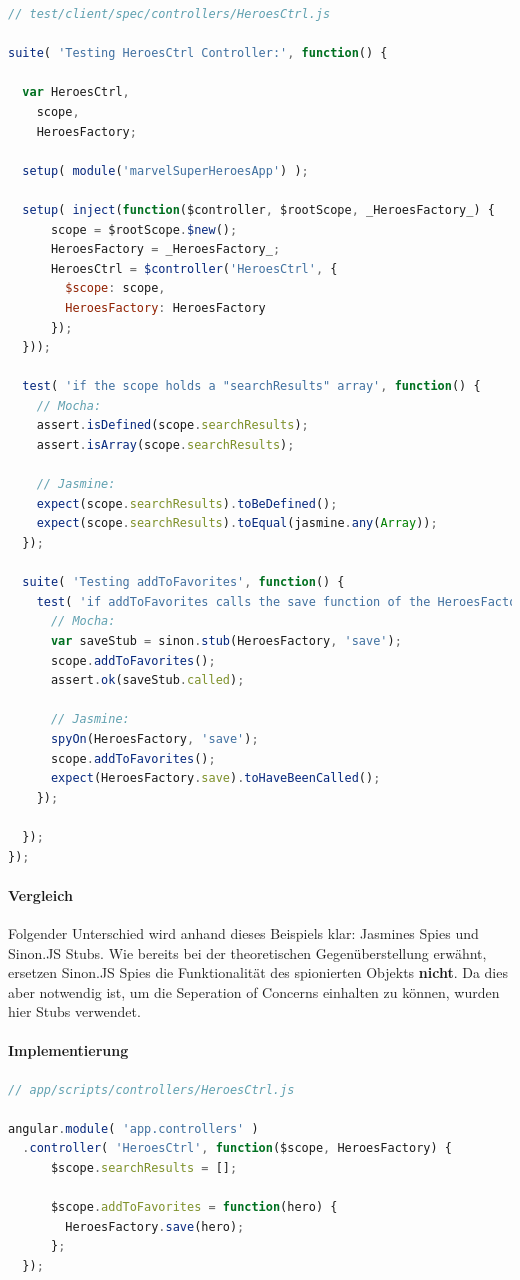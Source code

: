 \begin{lstlisting}[language=JavaScript, caption=TDD AngularJS - Controller]
// test/client/spec/controllers/HeroesCtrl.js

suite( 'Testing HeroesCtrl Controller:', function() {

  var HeroesCtrl,
    scope,
    HeroesFactory;

  setup( module('marvelSuperHeroesApp') );

  setup( inject(function($controller, $rootScope, _HeroesFactory_) {
      scope = $rootScope.$new();
      HeroesFactory = _HeroesFactory_;
      HeroesCtrl = $controller('HeroesCtrl', {
        $scope: scope,
        HeroesFactory: HeroesFactory
      });
  }));

  test( 'if the scope holds a "searchResults" array', function() {
    // Mocha:
    assert.isDefined(scope.searchResults);
    assert.isArray(scope.searchResults);

    // Jasmine:
    expect(scope.searchResults).toBeDefined();
    expect(scope.searchResults).toEqual(jasmine.any(Array));
  });

  suite( 'Testing addToFavorites', function() {
    test( 'if addToFavorites calls the save function of the HeroesFactory', function() {
      // Mocha:
      var saveStub = sinon.stub(HeroesFactory, 'save');
      scope.addToFavorites();
      assert.ok(saveStub.called);

      // Jasmine:
      spyOn(HeroesFactory, 'save');
      scope.addToFavorites();
      expect(HeroesFactory.save).toHaveBeenCalled();
    });

  });
});
\end{lstlisting}

\paragraph{Vergleich}
Folgender Unterschied wird anhand dieses Beispiels klar: Jasmines Spies und Sinon.JS Stubs. Wie bereits bei der theoretischen Gegenüberstellung erwähnt, ersetzen Sinon.JS Spies die Funktionalität des spionierten Objekts \textbf{nicht}. Da dies aber notwendig ist, um die Seperation of Concerns einhalten zu können, wurden hier Stubs verwendet.

\paragraph{Implementierung}
\begin{lstlisting}[language=JavaScript, caption=TDD AngularJS - Controller - Implementierung]
// app/scripts/controllers/HeroesCtrl.js

angular.module( 'app.controllers' )
  .controller( 'HeroesCtrl', function($scope, HeroesFactory) {
      $scope.searchResults = [];

      $scope.addToFavorites = function(hero) {
        HeroesFactory.save(hero);
      };
  });

\end{lstlisting}

